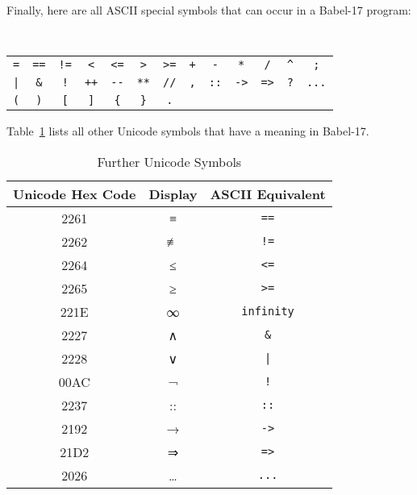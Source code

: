 \documentclass[11pt]{amsart}
\newcommand{\babelsrc}[1] {\lstinline!#1!}
\begin{document}
Finally, here are all ASCII special symbols that can occur in a Babel-17 program:
\newcommand{\mapcurlyleft}{\{|}
\begin{center}
\tt
\begin{tabular}{ccccccccccccc}
\verb+=+ & \verb+==+ & \verb+!=+ & \verb+<+ & \verb+<=+ & \verb+>+& \verb+>=+  &
\verb-+- & \verb+-+ & \verb+*+ & \verb+/+ & \verb+^+ & \verb+;+  \\
\verb-|- & \verb+&+ & \verb+!+ & \verb-++- & \verb+--+& \verb+**+  &
\verb-//- & \verb+,+ & \verb+::+ & \verb+->+ & \verb+=>+& \verb+?+  & \verb+...+  \\
\verb-(- & \verb+)+ & \verb+[+ & \verb+]+ & \verb+{+& \verb+}+  & \verb+.+ &   &
& & & 
\end{tabular}
\end{center}
Table~\ref{table:furthersymbols} lists all other Unicode symbols that have a meaning in Babel-17.
\begin{table}
\caption{Further Unicode Symbols}
\begin{tabular}{c|c|c}
\textbf{Unicode Hex Code} & \textbf{Display} & \textbf{ASCII Equivalent}\\\hline
2261 & ≡ & \verb+==+\\
2262 & ≢ & \verb+!=+\\
2264 & ≤ & \verb+<=+\\
2265 &  ≥ & \verb+>=+\\
221E & ∞ & \babelsrc{infinity}\\ 
2227 & ∧ & \verb+&+\\
2228 & ∨ & \verb+|+\\
00AC & ¬ & \verb+!+\\
2237 & :: & \verb+::+\\
2192 & → & \verb+->+\\
21D2 & ⇒ & \verb+=>+\\
2026 & … & \verb+...+\\
\end{tabular}
\label{table:furthersymbols}
\end{table}
\end{document}
